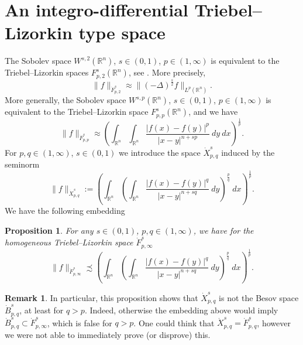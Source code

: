 \documentclass[12pt]{amsart}
\newtheorem{proposition}[theorem]{Proposition}
\theoremstyle{definition}
\newtheorem{remark}[theorem]{Remark}
\newcommand{\R}{\mathbb{R}}
\newcommand{\brac}[1]{\left (#1 \right )}
\numberwithin{theorem}{section} \numberwithin{equation}{section}
\newcommand{\lap}{\Delta }
\newcommand{\aleq}{\precsim}
\newcommand{\aeq}{\approx}
\newcommand{\laps}[1]{(-\lap)^{\frac{#1}{2}}}
\begin{document}
\section{An integro-differential Triebel--Lizorkin type space}\label{s:triebel}
The Sobolev space $W^{s,2}(\R^n)$, $s \in (0,1)$, $p \in (1,\infty)$ is equivalent to the Triebel--Lizorkin spaces $F^s_{p,2}(\R^n)$, see \cite{GrafakosCF,GrafakosMF,Runst-Sickel-1996}. More precisely,
\begin{equation}\label{eq:triebelFsp2}
 \|f\|_{\dot{F}^s_{p,2}} \aeq \|\laps{s} f\|_{L^p(\R^n)}.
\end{equation}
More generally, the Sobolev space $W^{s,p}(\R^n)$, $s \in (0,1)$, $p \in (1,\infty)$ is equivalent to the Triebel--Lizorkin space $F^s_{p,p}(\R^n)$, and we have
\[
 \|f\|_{\dot{F}^s_{p,p}} \aeq \brac{\int_{\R^n} \int_{\R^n} \frac{|f(x)-f(y)|^p}{|x-y|^{n+sp}}\ dy\ dx}^{\frac{1}{p}}.
\]
For $p,q \in (1,\infty)$, $s \in (0,1)$ we introduce the space $\dot{X}^{s}_{p,q}$ induced by the seminorm
\[
\|f\|_{\dot{X}^s_{p,q}} := 
\brac{\int_{\R^n} \brac{\int_{\R^n} \frac{|f(x)-f(y)|^q}{|x-y|^{n+sq}}\ dy}^{\frac{p}{q}}\ dx}^{\frac{1}{p}}.
\]
We have the following embedding
\begin{proposition}\label{pr:triebelembedding}
For any $s \in (0,1)$, $p,q \in (1,\infty)$, we have for the homogeneous Triebel--Lizorkin space $\dot{F}^s_{p,\infty}$
\[
 \|f\|_{\dot{F}^s_{p,\infty}} \aleq \brac{\int_{\R^n} \brac{\int_{\R^n} \frac{|f(x)-f(y)|^q}{|x-y|^{n+sq}}\ dy}^{\frac{p}{q}}\ dx}^{\frac{1}{p}}.
\]
\end{proposition}
\begin{remark}
In particular, this proposition shows that $\dot{X}^{s}_{p,q}$ is not the Besov space $\dot{B}^s_{p,q}$, at least for $q>p$. Indeed, otherwise the embedding above would imply $\dot{B}^s_{p,q} \subset \dot{F}^{s}_{p,\infty}$, which is false for $q > p$. 
One could think that $\dot{X}^s_{p,q} = \dot{F}^{s}_{p,q}$, however we were not able to immediately prove (or disprove) this. \end{remark}
\end{document}
